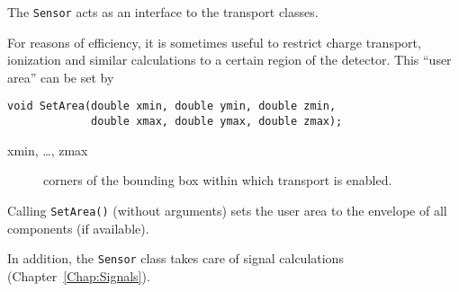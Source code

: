 The \texttt{Sensor} acts as an interface to the transport classes.

For reasons of efficiency, it is sometimes useful to restrict 
charge transport, ionization and similar calculations to a 
certain region of the detector.
This ``user area'' can be set by
\begin{lstlisting}
void SetArea(double xmin, double ymin, double zmin,
             double xmax, double ymax, double zmax);
\end{lstlisting} 
\begin{description}
\item[xmin, \dots, zmax]
corners of the bounding box within which transport is enabled. 
\end{description}
Calling \texttt{SetArea()} (without arguments) sets the 
user area to the envelope of all components (if available).

In addition, the \texttt{Sensor} class takes care of 
signal calculations (Chapter~\ref{Chap:Signals}).

